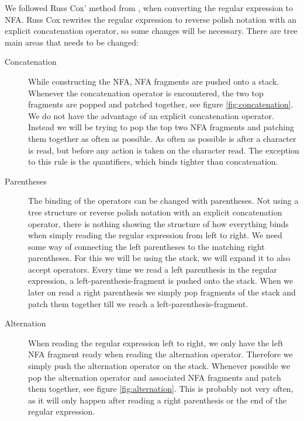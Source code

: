 We followed Russ Cox' method from \cite{RussCox}, when converting the
regular expression to NFA. Russ Cox rewrites the regular expression to
reverse polish notation with an explicit concatenation operator, so
some changes will be necessary. There are tree main areas that needs
to be changed:

\begin{description}
\item[Concatenation] While constructing the NFA, NFA fragments are
  pushed onto a stack. Whenever the concatenation operator is
  encountered, the two top fragments are popped and patched together,
  see figure \vref{fig:concatenation}. We do not have the advantage of
  an explicit concatenation operator. Instead we will be trying to pop
  the top two NFA fragments and patching them together as often as
  possible. As often as possible is after a character is read, but
  before any action is taken on the character read. The exception to
  this rule is the quantifiers, which binds tighter than
  concatenation.
\item[Parentheses] The binding of the operators can be changed with
  parentheses. Not using a tree structure or reverse polish notation
  with an explicit concatenation operator, there is nothing showing
  the structure of how everything binds when simply reading the
  regular expression from left to right. We need some way of
  connecting the left parentheses to the matching right
  parentheses. For this we will be using the stack, we will expand it
  to also accept operators. Every time we read a left parenthesis in
  the regular expression, a left-parenthesis-fragment is pushed onto
  the stack. When we later on read a right parenthesis we simply pop
  fragments of the stack and patch them together till we reach a
  left-parenthesis-fragment.   
\item[Alternation] When reading the regular expression left to right,
  we only have the left NFA fragment ready when reading the
  alternation operator. Therefore we simply push the alternation
  operator on the stack. Whenever possible we pop the alternation
  operator and associated NFA fragments and patch them together, see
  figure \vref{fig:alternation}. This is probably not very often, as
  it will only happen after reading a right parenthesis or the end of
  the regular expression.
\end{description}


